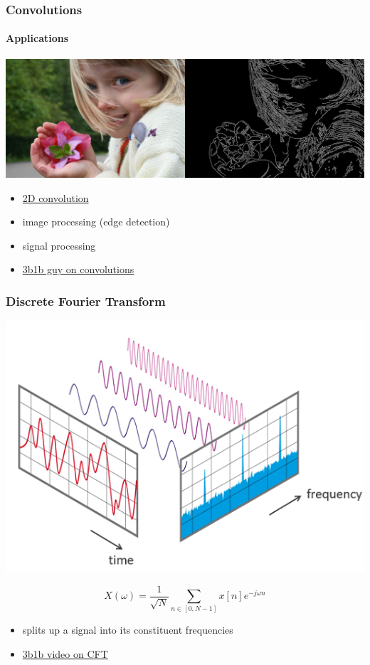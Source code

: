 \documentclass[aspectratio=169]{beamer}
\begin{document}
\begin{frame}
    \frametitle{Convolutions}
    \framesubtitle{Applications}

    \begin{center}
        \includegraphics[height=0.5\textheight]{edge-detection.png}
    \end{center}
    \begin{itemize}
        \item \href{https://towardsdatascience.com/intuitively-understanding-convolutions-for-deep-learning-1f6f42faee1}{2D convolution}
        \item image processing (edge detection)
        \item signal processing
        \item \href{https://youtu.be/8rrHTtUzyZA?list=PLP8iPy9hna6Q2Kr16aWPOKE0dz9OnsnIJ}{3b1b guy on convolutions}
    \end{itemize}
\end{frame}

\begin{frame}
    \frametitle{Discrete Fourier Transform}

    \begin{center}
        \includegraphics[height=0.5\textheight]{fourier.png}
    \end{center}
    \begin{equation}
        X(\omega) = \frac{1}{\sqrt{N}} \sum_{n \in [0, N - 1]} x[n] e^{-j \omega n}
    \end{equation}
    \begin{itemize}
        \item splits up a signal into its constituent frequencies
        \item \href{https://youtu.be/spUNpyF58BY}{3b1b video on CFT}
    \end{itemize}
\end{frame}
\end{document}
